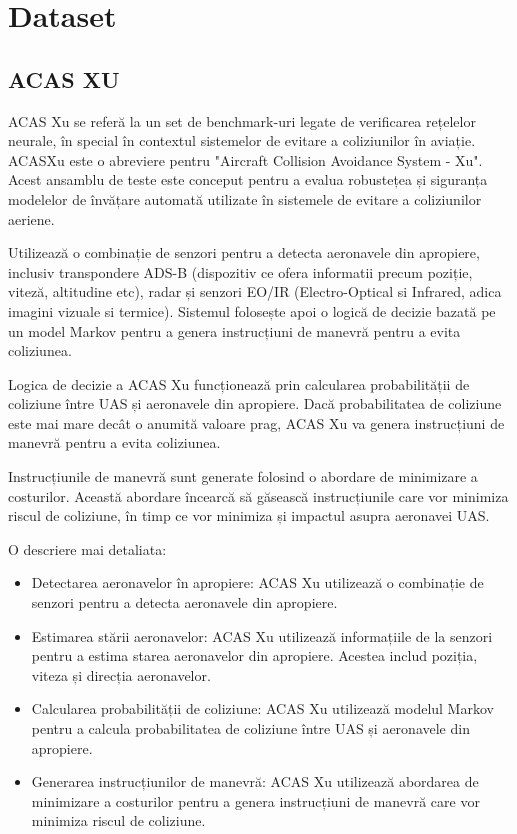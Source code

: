 \documentclass[12pt,a4paper]{article}
\begin{document}
\section{Dataset}

\subsection{ACAS XU}

ACAS Xu se referă la un set de benchmark-uri legate de verificarea rețelelor neurale, în special în contextul sistemelor de evitare a coliziunilor în aviație. ACASXu este o abreviere pentru "Aircraft Collision Avoidance System - Xu". Acest ansamblu de teste este conceput pentru a evalua robustețea și siguranța modelelor de învățare automată utilizate în sistemele de evitare a coliziunilor aeriene.

Utilizează o combinație de senzori pentru a detecta aeronavele din apropiere, inclusiv transpondere ADS-B (dispozitiv ce ofera informatii precum poziție, viteză, altitudine etc), radar și senzori EO/IR (Electro-Optical si Infrared, adica imagini vizuale si termice). Sistemul folosește apoi o logică de decizie bazată pe un model Markov pentru a genera instrucțiuni de manevră pentru a evita coliziunea.

Logica de decizie a ACAS Xu funcționează prin calcularea probabilității de coliziune între UAS și aeronavele din apropiere. Dacă probabilitatea de coliziune este mai mare decât o anumită valoare prag, ACAS Xu va genera instrucțiuni de manevră pentru a evita coliziunea.

Instrucțiunile de manevră sunt generate folosind o abordare de minimizare a costurilor. Această abordare încearcă să găsească instrucțiunile care vor minimiza riscul de coliziune, în timp ce vor minimiza și impactul asupra aeronavei UAS.

O descriere mai detaliata:

\begin{itemize}
  \item 
    Detectarea aeronavelor în apropiere: ACAS Xu utilizează o combinație de senzori pentru a detecta aeronavele din apropiere. 
  \item Estimarea stării aeronavelor: ACAS Xu utilizează informațiile de la senzori pentru a estima starea aeronavelor din apropiere. Acestea includ poziția, viteza și direcția aeronavelor.
  \item Calcularea probabilității de coliziune: ACAS Xu utilizează modelul Markov pentru a calcula probabilitatea de coliziune între UAS și aeronavele din apropiere.
   \item Generarea instrucțiunilor de manevră: ACAS Xu utilizează abordarea de minimizare a costurilor pentru a genera instrucțiuni de manevră care vor minimiza riscul de coliziune.
\end{itemize}
\end{document}
